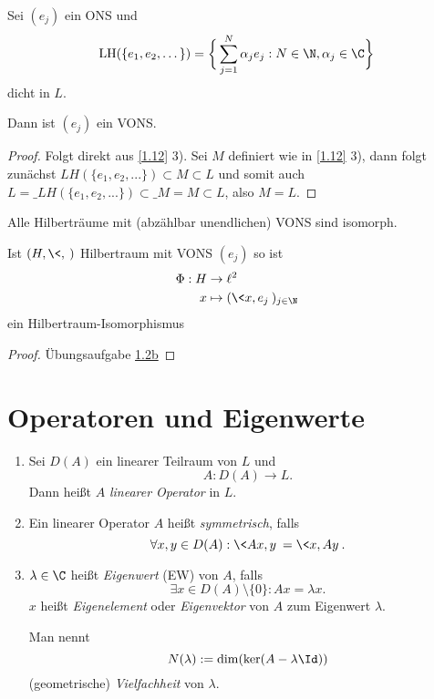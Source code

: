 \documentclass{mycourse}
\newcommand{\LH}{\operatorname{LH}}
\begin{document}
\begin{nt} \label{1.15}
	Sei $(e_j)$ ein ONS und
	\[
		\LH(\{e_1,e_2,\dotsc\}) = \bigg\{ \sum_{j=1}^N \alpha_j e_j : N \in \N, \alpha_j \in \C \bigg\}
	\]
	dicht in $L$.

	Dann ist $(e_j)$ ein VONS.
	\begin{proof}
		Folgt direkt aus \ref{1.12} 3). Sei $ M $ definiert wie in \ref{1.12} 3), dann folgt zunächst $ LH(\{e_1,e_2,...\})\subset M \subset L $ und somit auch $ L=\_{LH(\{e_1,e_2,...\})}\subset \_ M=M\subset L $, also $ M=L $.
	\end{proof}
\end{nt}

\begin{st} \label{1.16}
	Alle Hilberträume mit (abzählbar unendlichen) VONS sind isomorph. 

	Ist $(H,\<,\>)$ Hilbertraum mit VONS $(e_j)$ so ist
	\begin{align*}
		\Phi: H &\to \ell^2 \\
		x &\mapsto (\<x,e_j\>)_{j\in \N}
	\end{align*}
	ein Hilbertraum-Isomorphismus
	\begin{proof}
		Übungsaufgabe \href{http://www.iadm.uni-stuttgart.de/LstAnaMPhy/Lesky/Vorlesungen/13-Hoehere-Analysis/blatt01.pdf}{1.2b}
	\end{proof}
\end{st}



\section{Operatoren und Eigenwerte}



\begin{df} \label{1.17}
	\begin{enumerate}[1)]
		\item
			Sei $D(A)$ ein linearer Teilraum von $L$ und
			\[
				A : D(A) \to L.
			\]
			Dann heißt $A$ \emph{linearer Operator} in $L$.
		\item
			Ein linearer Operator $A$ heißt \emph{symmetrisch}, falls
			\[
				\forall x,y \in D(A) : \<Ax,y\> = \<x,Ay\>.
			\]
		\item
			$\lambda \in \C$ heißt \emph{Eigenwert} (EW) von $A$, falls
			\[
				\exists x \in D(A) \setminus \{0\} : Ax = \lambda x.
			\]
			$x$ heißt \emph{Eigenelement} oder \emph{Eigenvektor} von $A$ zum Eigenwert $\lambda$.

			Man nennt
			\[
				N(\lambda) := \dim (\ker(A-\lambda \Id))
			\]
			(geometrische) \emph{Vielfachheit} von $\lambda$.
	\end{enumerate}
\end{df}
\end{document}
